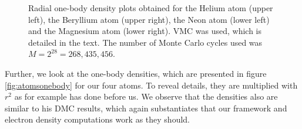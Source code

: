 \begin{figure}
	\caption{Radial one-body density plots obtained for the Helium atom (upper left), the Beryllium atom (upper right), the Neon atom (lower left) and the Magnesium atom (lower right). VMC was used, which is detailed in the text. The number of Monte Carlo cycles used was $M=2^{28}=268,435,456$.}
	\label{fig:atomsonebody}
\end{figure}
Further, we look at the one-body densities, which are presented in figure \eqref{fig:atomsonebody} for our four atoms. To reveal details, they are multiplied with $r^2$ as for example \citet{hogberget_quantum_2013} has done before us. We observe that the densities also are similar to his DMC results, which again substantiates that our framework and electron density computations work as they should.
